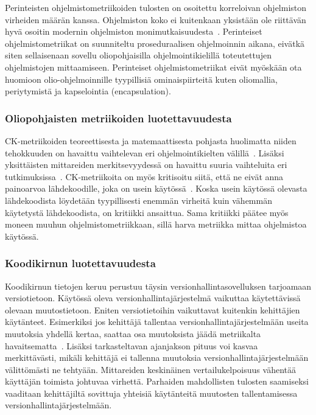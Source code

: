 \documentclass[finnish]{tktltiki2}
\theoremstyle{definition}
\theoremstyle{remark}
\begin{document}
Perinteisten ohjelmistometriikoiden tulosten on osoitettu korreloivan ohjelmiston virheiden määrän kanssa. Ohjelmiston koko ei kuitenkaan yksistään ole riittävän hyvä osoitin modernin ohjelmiston monimutkaisuudesta~\cite{FN99}. Perinteiset ohjelmistometriikat on suunniteltu proseduraalisen ohjelmoinnin aikana, eivätkä siten sellaisenaan sovellu oliopohjaisilla ohjelmointikielillä toteutettujen ohjelmistojen mittaamiseen. Perinteiset ohjelmistometriikat eivät myöskään ota huomioon olio-ohjelmoinnille tyypillisiä ominaispiirteitä kuten oliomallia, periytymistä ja kapselointia (encapsulation).

\subsubsection{Oliopohjaisten metriikoiden luotettavuudesta}

CK-metriikoiden teoreettisesta ja matemaattisesta pohjasta huolimatta niiden tehokkuuden on havaittu vaihtelevan eri ohjelmointikielten välillä~\cite{SK03}. Lisäksi yksittäisten mittareiden merkitsevyydessä on havaittu suuria vaihteluita eri tutkimuksissa~\cite{OEGQ07, SK03, TKC99}. CK-metriikoita on myös kritisoitu siitä, että ne eivät anna painoarvoa lähdekoodille, joka on usein käytössä~\cite{TKC99}. Koska usein käytössä olevasta lähdekoodista löydetään tyypillisesti enemmän virheitä kuin vähemmän käytetystä lähdekoodista, on kritiikki ansaittua. Sama kritiikki päätee myös moneen muuhun ohjelmistometriikkaan, sillä harva metriikka mittaa ohjelmistoa käytössä.

\subsubsection{Koodikirnun luotettavuudesta}

Koodikirnun tietojen keruu perustuu täysin versionhallintasovelluksen tarjoamaan versiotietoon. Käytössä oleva versionhallintajärjestelmä vaikuttaa käytettävissä olevaan muutostietoon. Eniten versiotietoihin vaikuttavat kuitenkin kehittäjien käytänteet. Esimerkiksi jos kehittäjä tallentaa versionhallintajärjestelmään useita muutoksia yhdellä kertaa, saattaa osa muutoksista jäädä metriikalta havaitsematta~\cite{NB05}. Lisäksi tarkasteltavan ajanjakson pituus voi kasvaa merkittävästi, mikäli kehittäjä ei tallenna muutoksia versionhallintajärjestelmään välittömästi ne tehtyään. Mittareiden keskinäinen vertailukelpoisuus vähentää käyttäjän toimista johtuvaa virhettä. Parhaiden mahdollisten tulosten saamiseksi vaaditaan kehittäjiltä sovittuja yhteisiä käytänteitä muutosten tallentamisessa versionhallintajärjestelmään.
\end{document}
